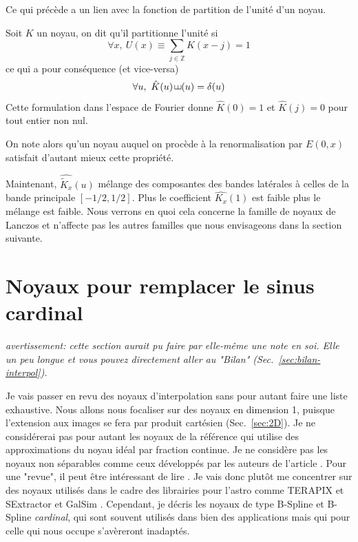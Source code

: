 \documentclass[11pt,twoside]{article}
\DeclareMathOperator{\comb}{\raisebox{\depth}{\rotatebox{270}{$\exists$}}}
\begin{document}
Ce qui précède a un lien avec la fonction de partition de l'unité d'un noyau.
\begin{propriete}\label{prop:unite}
Soit $K$ un noyau, on dit  qu'il partitionne l'unité si
\begin{equation}
\forall x,\ U(x)\equiv \sum_{j\in\mathbb{Z}} K(x-j) = 1 
\end{equation} 
ce qui a pour conséquence (et vice-versa)
\begin{equation}
\forall u,\ \hat{K}(u) \comb(u)=\delta(u)
\end{equation}
Cette formulation dans l'espace de Fourier donne $\hat{K}(0)=1$ et $\hat{K}(j)=0$ pour tout entier non nul.
\end{propriete} 
On note alors qu'un noyau auquel on procède à la renormalisation par $E(0,x)$ satisfait d'autant mieux cette propriété.
 

Maintenant,  $\widehat{\tilde{K}_x}(u)$ mélange des composantes des  bandes latérales à celles de la bande principale $[-1/2,1/2]$. Plus le coefficient $\hat{K_x}(1)$ est faible plus le mélange est faible. Nous verrons en quoi cela concerne la famille de noyaux de Lanczos et n'affecte pas les autres familles que nous envisageons dans la section suivante.
%
\section{Noyaux pour remplacer le sinus cardinal}
%

\textit{avertissement: cette section aurait pu faire par elle-même une note en soi. Elle un peu longue et vous pouvez directement aller au "Bilan" (Sec.~\ref{sec:bilan-interpol}).  
}

Je vais passer en revu des noyaux d'interpolation sans pour autant faire une liste exhaustive. Nous allons nous focaliser sur des noyaux en dimension 1, puisque l'extension aux images se fera par produit cartésien (Sec.~\ref{sec:2D}). Je ne considérerai pas pour autant les noyaux de la référence \citep{HU200646} qui utilise des approximations du noyau idéal par fraction continue. Je ne considère pas les noyaux non séparables comme ceux développés par les auteurs de l'article \citep{Shi2006ImageIB}. Pour une "revue", il peut être intéressant de lire \cite{Parsania2016}. Je vais donc plutôt me concentrer sur des noyaux utilisés dans le cadre des librairies pour l'astro comme \textsf{TERAPIX}  et \textsf{SExtractor} \citep{2011ASPC..442..435B} et \textsf{GalSim} \citep{2015A&C....10..121R}. Cependant, je décris les noyaux de type B-Spline et B-Spline \textit{cardinal}, qui sont souvent utilisés dans bien des applications mais qui pour celle qui nous occupe s'avèreront inadaptés.
%
\end{document}
